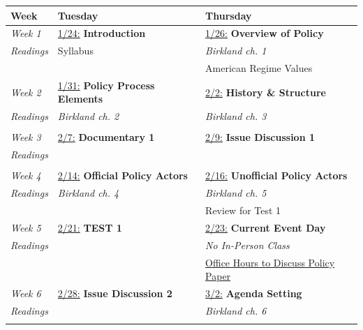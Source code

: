 \documentclass[11pt]{article}
\begin{document}
\begin{center}
\begin{longtable}{p{1.5cm} | p{7.8cm} | p{7.5cm}}	
	\large{\textbf{Week}} & \large{\textbf{Tuesday}} 						& \large{\textbf{Thursday}} 						\\ \hline \hline
	
	\emph{Week 1} 	& \underline{1/24:} \textbf{Introduction}				& \underline{1/26:} \textbf{Overview of Policy} 		\\
	\emph{Readings}	& Syllabus 												& \textit{Birkland ch. 1}								\\
					& 														&	American Regime Values								\\ \hline
	
	\emph{Week 2} 	& \underline{1/31:} \textbf{Policy Process Elements}	&  \underline{2/2:} \textbf{History \& Structure} 		\\
	\emph{Readings} & \textit{Birkland ch. 2}								&  \textit{Birkland ch. 3}									\\
					& 														& 														\\ \hline
	
	\emph{Week 3}	& 	\underline{2/7:} \textbf{Documentary 1}				& \underline{2/9:} \textbf{Issue Discussion 1}				\\
	\emph{Readings}	& 														& 															\\
					& 														& 														\\ \hline
	
	\emph{Week 4}	& \underline{2/14:} \textbf{Official Policy Actors}		& \underline{2/16:} \textbf{Unofficial Policy Actors}		\\
	\emph{Readings}	& \textit{Birkland ch. 4 }								& \textit{Birkland ch. 5}								\\
					&														& Review for Test 1										\\ \hline
				
	\emph{Week 5}	& \underline{2/21:} \textbf{TEST 1}		 				& \underline{2/23:} \textbf{Current Event Day} 				\\
	\emph{Readings}	& 														& \textit{No In-Person Class}							\\
					& 														& \href{https://t.ly/4dpa}{Office Hours to Discuss Policy Paper}			\\ \hline	

	
	\emph{Week 6}  	& \underline{2/28:} \textbf{Issue Discussion 2}			& \underline{3/2:} \textbf{Agenda Setting}			\\
	\emph{Readings}	& 														& \textit{Birkland ch. 6} 									\\
					& 														& 													\\ \hline	
	

\end{longtable}
\end{center}
\end{document}
